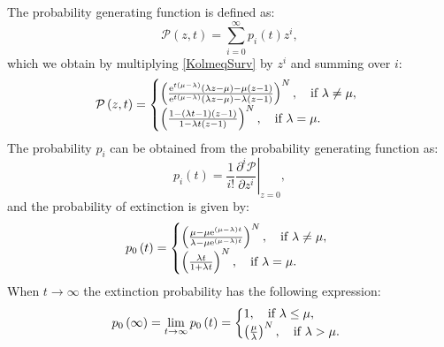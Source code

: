 \documentclass[12pt]{extarticle}
\newcommand{\e}{{\rm e}}
\begin{document}
\begin{appendices}
The probability generating function is defined as:
\begin{equation*}
\mathcal{P}\left(z,t\right)=\sum_{i=0}^\infty p_i\left(t\right)z^i,
\end{equation*}
which we obtain by multiplying \eqref{KolmeqSurv} by $z^i$ and summing over $i$:
\begin{align*}
\mathcal{P}\left(z,t\right)=\left\{
  \begin{array}{@{}ll@{}}
  \left(\frac{\e^{t\left(\mu-\lambda\right)}\left(\lambda z-\mu\right)-\mu\left(z-1\right)}{\e^{t\left(\mu-\lambda\right)}\left(\lambda z-\mu\right)-\lambda\left(z-1\right)}\right)^N,\quad \text{if }\lambda\neq\mu, \\
  \left(\frac{1-\left(\lambda t-1\right)\left(z-1\right)}{1-\lambda t\left(z-1\right)}\right)^N,\quad \text{if }\lambda=\mu.
  \end{array}\right.
\end{align*}
The probability $p_i$ can be obtained from the probability generating function as:
\begin{equation*}
p_i\left(t\right)=\left.\frac{1}{i!}\frac{\partial^i\mathcal{P}}{\partial z^i}\right|_{z=0},
\end{equation*}
and the probability of extinction is given by:
\begin{align*}
p_0\left(t\right)=\left\{
  \begin{array}{@{}ll@{}}
  \left(\frac{\mu-\mu\e^{\left(\mu-\lambda\right)t}}{\lambda-\mu\e^{\left(\mu-\lambda\right)t}}\right)^N,\quad \text{if }\lambda\neq\mu, \\
  \left(\frac{\lambda t}{1+\lambda t}\right)^N,\quad \text{if }\lambda=\mu.
  \end{array}\right.
\end{align*}
When $t\rightarrow\infty$ the extinction probability has the following expression:
\begin{align*}
p_0\left(\infty\right)=\lim_{t\rightarrow\infty}p_0\left(t\right)=\left\{
  \begin{array}{@{}ll@{}}
  1,\quad \text{if }\lambda\leq\mu, \\
  \left(\frac{\mu}{\lambda}\right)^N,\quad \text{if }\lambda>\mu.
  \end{array}\right.
\end{align*}

\end{appendices}
\end{document}

